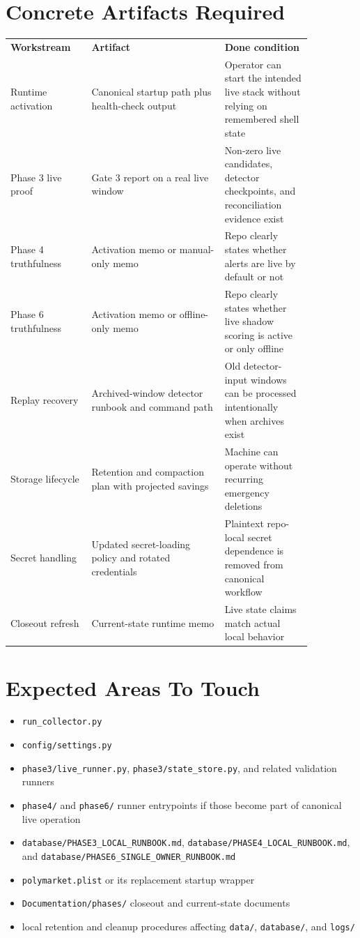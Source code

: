 \documentclass{article}
\begin{document}
\section*{Concrete Artifacts Required}
\begin{longtable}{p{0.23\linewidth}p{0.38\linewidth}p{0.25\linewidth}}
\textbf{Workstream} & \textbf{Artifact} & \textbf{Done condition} \\
Runtime activation & Canonical startup path plus health-check output & Operator can start the intended live stack without relying on remembered shell state \\
Phase 3 live proof & Gate 3 report on a real live window & Non-zero live candidates, detector checkpoints, and reconciliation evidence exist \\
Phase 4 truthfulness & Activation memo or manual-only memo & Repo clearly states whether alerts are live by default or not \\
Phase 6 truthfulness & Activation memo or offline-only memo & Repo clearly states whether live shadow scoring is active or only offline \\
Replay recovery & Archived-window detector runbook and command path & Old detector-input windows can be processed intentionally when archives exist \\
Storage lifecycle & Retention and compaction plan with projected savings & Machine can operate without recurring emergency deletions \\
Secret handling & Updated secret-loading policy and rotated credentials & Plaintext repo-local secret dependence is removed from canonical workflow \\
Closeout refresh & Current-state runtime memo & Live state claims match actual local behavior \\
\end{longtable}

\section*{Expected Areas To Touch}
\begin{itemize}
\item \texttt{run\_collector.py}
\item \texttt{config/settings.py}
\item \texttt{phase3/live\_runner.py}, \texttt{phase3/state\_store.py}, and related validation runners
\item \texttt{phase4/} and \texttt{phase6/} runner entrypoints if those become part of canonical live operation
\item \texttt{database/PHASE3\_LOCAL\_RUNBOOK.md}, \texttt{database/PHASE4\_LOCAL\_RUNBOOK.md}, and \texttt{database/PHASE6\_SINGLE\_OWNER\_RUNBOOK.md}
\item \texttt{polymarket.plist} or its replacement startup wrapper
\item \texttt{Documentation/phases/} closeout and current-state documents
\item local retention and cleanup procedures affecting \texttt{data/}, \texttt{database/}, and \texttt{logs/}
\end{itemize}
\end{document}
